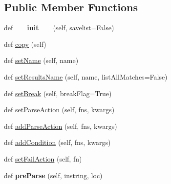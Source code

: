 \subsection*{Public Member Functions}
\begin{DoxyCompactItemize}
\item 
\mbox{\label{classpkg__resources_1_1__vendor_1_1pyparsing_1_1_parser_element_a21add207f1cb5e90c1732ac27449c1e7}} 
def {\bfseries \+\_\+\+\_\+init\+\_\+\+\_\+} (self, savelist=False)
\item 
def \hyperlink{classpkg__resources_1_1__vendor_1_1pyparsing_1_1_parser_element_a4bd956ef315744a6fda3bfa660121750}{copy} (self)
\item 
def \hyperlink{classpkg__resources_1_1__vendor_1_1pyparsing_1_1_parser_element_a65024e7147c8b3d4fd3d0d161429737f}{set\+Name} (self, name)
\item 
def \hyperlink{classpkg__resources_1_1__vendor_1_1pyparsing_1_1_parser_element_a787aafab87357373be31819f83517344}{set\+Results\+Name} (self, name, list\+All\+Matches=False)
\item 
def \hyperlink{classpkg__resources_1_1__vendor_1_1pyparsing_1_1_parser_element_a28cc2d9e28a3a71517249b2e9e5df9d5}{set\+Break} (self, break\+Flag=True)
\item 
def \hyperlink{classpkg__resources_1_1__vendor_1_1pyparsing_1_1_parser_element_a4fc9391373f5434729bec5a5440a2788}{set\+Parse\+Action} (self, fns, kwargs)
\item 
def \hyperlink{classpkg__resources_1_1__vendor_1_1pyparsing_1_1_parser_element_a21d9aab48590eca6709948628a4df8cd}{add\+Parse\+Action} (self, fns, kwargs)
\item 
def \hyperlink{classpkg__resources_1_1__vendor_1_1pyparsing_1_1_parser_element_aa60387fa923bdb94d8eb4f0e69261963}{add\+Condition} (self, fns, kwargs)
\item 
def \hyperlink{classpkg__resources_1_1__vendor_1_1pyparsing_1_1_parser_element_a542346bef86eb4801a0cc81f709ee2c0}{set\+Fail\+Action} (self, fn)
\item 
\mbox{\label{classpkg__resources_1_1__vendor_1_1pyparsing_1_1_parser_element_a15edef53df0616117f456d035181f3b1}} 
def {\bfseries pre\+Parse} (self, instring, loc)
\item 
\mbox{\label{classpkg__resources_1_1__vendor_1_1pyparsing_1_1_parser_element_a8c5c41d249afece0b9418dbfefcf654b}} 

\end{DoxyCompactItemize}
